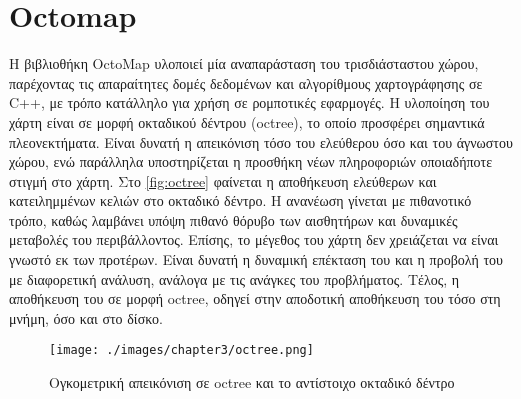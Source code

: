 \section{Octomap}
\label{section:octomap}

Η βιβλιοθήκη OctoMap \cite{hornung13auro} υλοποιεί μία αναπαράσταση του τρισδιάσταστου χώρου, παρέχοντας τις απαραίτητες δομές δεδομένων και αλγορίθμους χαρτογράφησης σε C++, με τρόπο κατάλληλο για χρήση σε  ρομποτικές εφαρμογές. Η υλοποίηση του χάρτη είναι σε μορφή οκταδικού δέντρου (octree), το οποίο προσφέρει σημαντικά πλεονεκτήματα. Είναι δυνατή η απεικόνιση τόσο του ελεύθερου όσο και του άγνωστου χώρου, ενώ παράλληλα υποστηρίζεται η προσθήκη νέων πληροφοριών οποιαδήποτε στιγμή στο χάρτη. Στο \autoref{fig:octree} φαίνεται η αποθήκευση ελεύθερων και κατειλημμένων κελιών στο οκταδικό δέντρο. Η ανανέωση γίνεται με πιθανοτικό τρόπο, καθώς λαμβάνει υπόψη πιθανό θόρυβο των αισθητήρων και δυναμικές μεταβολές του περιβάλλοντος. Επίσης, το μέγεθος του χάρτη δεν χρειάζεται να είναι γνωστό εκ των προτέρων. Είναι δυνατή η δυναμική επέκταση του και η προβολή του με διαφορετική ανάλυση, ανάλογα με τις ανάγκες του προβλήματος. Τέλος, η αποθήκευση του σε μορφή octree, οδηγεί στην αποδοτική αποθήκευση του τόσο στη μνήμη, όσο και στο δίσκο.

\begin{figure}[!ht]
    \centering
    \texttt{[image: ./images/chapter3/octree.png]}
    \caption{Ογκομετρική απεικόνιση σε octree και το αντίστοιχο οκταδικό δέντρο} 
    \label{fig:octree}
\end{figure}

